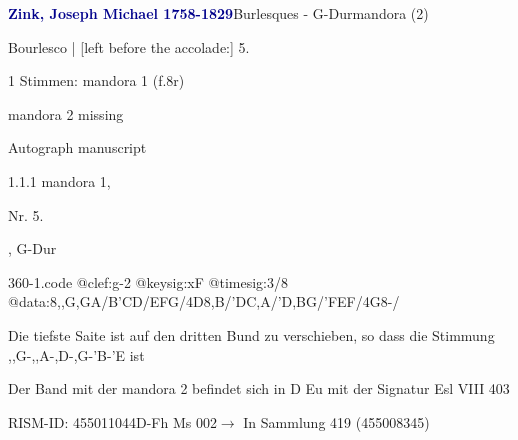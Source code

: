 \documentclass[twocolumn, 12pt]{book}
\begin{document}
\par \vspace{16pt} \textcolor{darkblue}{\textbf{Zink, Joseph Michael  1758-1829}}\hfillplus{\textbf{[360]}}\newline Burlesques - G-Dur\newline mandora (2)
\par \begin{itshape}[f.8r, at left:] Bourlesco | [left before the accolade:] 5.\end{itshape} 
\par \textcolor{darkblue}{}  1 Stimmen: mandora 1  (f.8r)\newline \begin{small} mandora 2 missing\end{small} \newline Autograph manuscript
\par 1.1.1  mandora 1, \begin{itshape}Nr. 5.\end{itshape}, G-Dur  
\begin{filecontents*}{360-1.code}
@clef:g-2
@keysig:xF
@timesig:3/8
@data:8,,G,GA/B'CD/EFG/4D8,B/'DC,A/'D,BG/'FEF/4G8-/
\end{filecontents*}
\newline %
\par Die tiefste Saite ist auf den dritten Bund zu verschieben, so dass die Stimmung ,,G-,,A-,D-,G-'B-'E ist
\par Der Band mit der mandora 2 befindet sich in D Eu mit der Signatur Esl VIII 403
\par RISM-ID: 455011044\newline D-Fh  Ms 002\newline $\rightarrow$ In Sammlung 419 (455008345)
      
\end{document}
